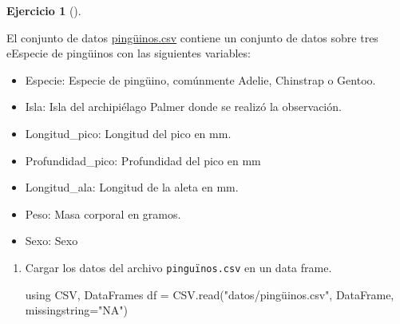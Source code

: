 \documentclass[
  a4paper,
]{scrreport}
\newenvironment{Shaded}{\begin{snugshade}}{\end{snugshade}}
\newcommand{\BuiltInTok}[1]{\textcolor[rgb]{0.00,0.23,0.31}{#1}}
\newcommand{\FunctionTok}[1]{\textcolor[rgb]{0.28,0.35,0.67}{#1}}
\newcommand{\ImportTok}[1]{\textcolor[rgb]{0.00,0.46,0.62}{#1}}
\newcommand{\NormalTok}[1]{\textcolor[rgb]{0.00,0.23,0.31}{#1}}
\newcommand{\OperatorTok}[1]{\textcolor[rgb]{0.37,0.37,0.37}{#1}}
\newcommand{\StringTok}[1]{\textcolor[rgb]{0.13,0.47,0.30}{#1}}
\providecommand{\tightlist}{%
  \setlength{\itemsep}{0pt}\setlength{\parskip}{0pt}}\usepackage{longtable,booktabs,array}
\theoremstyle{definition}
\newtheorem{exercise}{Ejercicio}[chapter]
\theoremstyle{remark}
\begin{document}
\begin{exercise}[]\protect\hypertarget{exr-arboles-decision-2}{}\label{exr-arboles-decision-2}

El conjunto de datos \href{}{pingüinos.csv} contiene un conjunto de
datos sobre tres eEspecie de pingüinos con las siguientes variables:

\begin{itemize}
\tightlist
\item
  Especie: Especie de pingüino, comúnmente Adelie, Chinstrap o Gentoo.
\item
  Isla: Isla del archipiélago Palmer donde se realizó la observación.
\item
  Longitud\_pico: Longitud del pico en mm.
\item
  Profundidad\_pico: Profundidad del pico en mm
\item
  Longitud\_ala: Longitud de la aleta en mm.
\item
  Peso: Masa corporal en gramos.
\item
  Sexo: Sexo
\end{itemize}

\begin{enumerate}
\def\labelenumi{\alph{enumi}.}
\item
  Cargar los datos del archivo \texttt{pinguïnos.csv} en un data frame.

  \begin{tcolorbox}[enhanced jigsaw, toptitle=1mm, colframe=quarto-callout-tip-color-frame, titlerule=0mm, left=2mm, arc=.35mm, colbacktitle=quarto-callout-tip-color!10!white, opacityback=0, bottomtitle=1mm, toprule=.15mm, coltitle=black, breakable, colback=white, rightrule=.15mm, opacitybacktitle=0.6, leftrule=.75mm, bottomrule=.15mm, title=\textcolor{quarto-callout-tip-color}{\faLightbulb}\hspace{0.5em}{Solución}]

\begin{Shaded}
\begin{Highlighting}[]
\ImportTok{using} \BuiltInTok{CSV}\NormalTok{, }\BuiltInTok{DataFrames}
\NormalTok{df }\OperatorTok{=}\NormalTok{ CSV.}\FunctionTok{read}\NormalTok{(}\StringTok{"datos/pingüinos.csv"}\NormalTok{, DataFrame, missingstring}\OperatorTok{=}\StringTok{"NA"}\NormalTok{)}
\end{Highlighting}
\end{Shaded}


\end{tcolorbox}
\end{enumerate}
\end{exercise}
\end{document}
